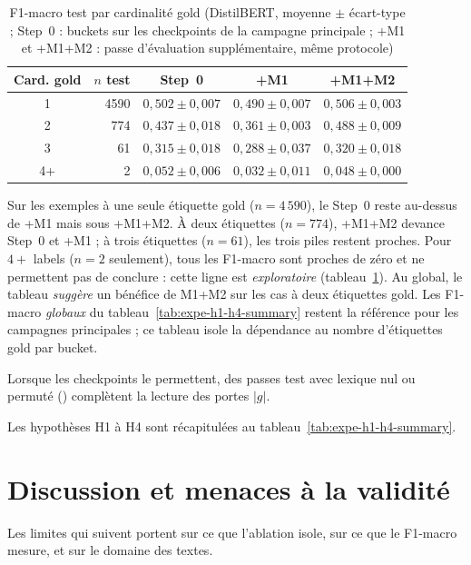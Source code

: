 \begin{table}[H]
\centering
\caption{F1-macro test par cardinalité gold (DistilBERT, moyenne $\pm$ écart-type ; Step~0 : buckets sur les checkpoints de la campagne principale ; +M1 et +M1+M2 : passe d'évaluation supplémentaire, même protocole)}
\label{tab:expe-cardinality}
\renewcommand{\arraystretch}{1.2}
\begin{tabular}{|c|r|c|c|c|}
\hline
\textbf{Card. gold} & \textbf{$n$ test} & \textbf{Step~0} & \textbf{+M1} & \textbf{+M1+M2} \\
\hline
1 & 4590 & $0{,}502 \pm 0{,}007$ & $0{,}490 \pm 0{,}007$ & $0{,}506 \pm 0{,}003$ \\
\hline
2 & 774 & $0{,}437 \pm 0{,}018$ & $0{,}361 \pm 0{,}003$ & $0{,}488 \pm 0{,}009$ \\
\hline
3 & 61 & $0{,}315 \pm 0{,}018$ & $0{,}288 \pm 0{,}037$ & $0{,}320 \pm 0{,}018$ \\
\hline
4+ & 2 & $0{,}052 \pm 0{,}006$ & $0{,}032 \pm 0{,}011$ & $0{,}048 \pm 0{,}000$ \\
\hline
\end{tabular}
\end{table}

Sur les exemples à une seule étiquette gold ($n{=}4\,590$), le Step~0
reste au-dessus de +M1 mais sous +M1+M2. À deux étiquettes ($n{=}774$),
+M1+M2 devance Step~0 et +M1 ; à trois étiquettes ($n{=}61$), les trois
piles restent proches. Pour $4+$ labels ($n{=}2$ seulement), tous les
F1-macro sont proches de zéro et ne permettent pas de conclure : cette
ligne est \emph{exploratoire} (tableau~\ref{tab:expe-cardinality}). Au
global, le tableau \emph{suggère} un bénéfice de M1+M2 sur les cas à
deux étiquettes gold. Les F1-macro \emph{globaux} du
tableau~\ref{tab:expe-h1-h4-summary} restent la référence pour les
campagnes principales ; ce tableau isole la dépendance au nombre
d'étiquettes gold par bucket.

Lorsque les checkpoints le permettent, des passes test avec lexique
nul ou permuté () complètent la lecture
des portes $|g|$.

Les hypothèses H1 à H4 sont récapitulées au
tableau~\ref{tab:expe-h1-h4-summary}.

\section{Discussion et menaces à la validité}
\label{sec:expe-discussion}

Les limites qui suivent portent sur ce que l'ablation isole, sur ce que
le F1-macro mesure, et sur le domaine des textes.

